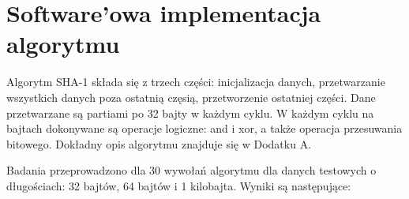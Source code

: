 \documentclass[oneside]{mgr}
\begin{document}
\section{Software'owa implementacja algorytmu}

Algorytm SHA-1 składa się z trzech części: inicjalizacja danych, przetwarzanie wszystkich danych poza ostatnią częsią, przetworzenie ostatniej części. Dane przetwarzane są partiami po 32 bajty w każdym cyklu. W każdym cyklu na bajtach dokonywane są operacje logiczne: and i xor, a także operacja przesuwania bitowego. Dokładny opis algorytmu znajduje się w Dodatku A.

Badania przeprowadzono dla 30 wywołań algorytmu dla danych testowych o długościach: 32 bajtów, 64 bajtów i 1 kilobajta. Wyniki są następujące:


\begin{table}


\end{table}
\end{document}

